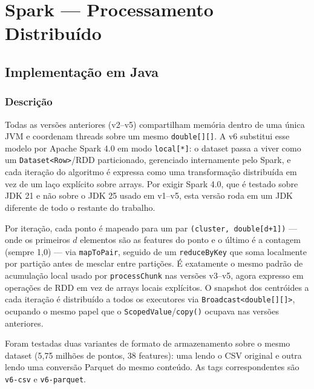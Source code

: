 \section{Spark --- Processamento Distribuído}
\label{sec:spark}

\subsection{Implementação em Java}

\subsubsection{Descrição}

Todas as versões anteriores (v2--v5) compartilham memória dentro de uma
única JVM e coordenam threads sobre um mesmo \texttt{double[][]}. A v6
substitui esse modelo por Apache Spark 4.0 em modo \texttt{local[*]}: o
dataset passa a viver como um \texttt{Dataset<Row>}/RDD particionado,
gerenciado internamente pelo Spark, e cada iteração do algoritmo é
expressa como uma transformação distribuída em vez de um laço explícito
sobre arrays. Por exigir Spark 4.0, que é testado sobre JDK 21 e não
sobre o JDK 25 usado em v1--v5, esta versão roda em um JDK diferente de
todo o restante do trabalho.

Por iteração, cada ponto é mapeado para um par
\texttt{(cluster, double[d+1])} --- onde os primeiros $d$ elementos são
as features do ponto e o último é a contagem (sempre 1,0) --- via
\texttt{mapToPair}, seguido de um \texttt{reduceByKey} que soma
localmente por partição antes de mesclar entre partições. É exatamente
o mesmo padrão de acumulação local usado por \texttt{processChunk} nas
versões v3--v5, agora expresso em operações de RDD em vez de arrays
locais explícitos. O snapshot dos centróides a cada iteração é
distribuído a todos os executores via \texttt{Broadcast<double[][]>},
ocupando o mesmo papel que o \texttt{ScopedValue}/\texttt{copy()} ocupava
nas versões anteriores.

Foram testadas duas variantes de formato de armazenamento sobre o mesmo
dataset (5,75 milhões de pontos, 38 features): uma lendo o CSV original
e outra lendo uma conversão Parquet do mesmo conteúdo. As tags
correspondentes são \texttt{v6-csv} e \texttt{v6-parquet}.

